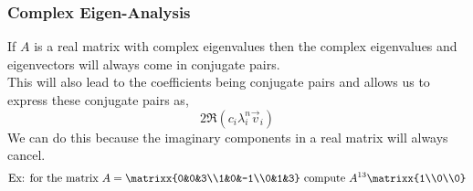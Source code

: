 \subsubsection{Complex Eigen-Analysis}
If $A$ is a real matrix with complex eigenvalues then the complex eigenvalues and eigenvectors will always come in conjugate pairs.\\
This will also lead to the coefficients being conjugate pairs and allows us to express these conjugate pairs as,
$$2\Re(c_i\lambda_i^n\vec{v}_i)$$
We can do this because the imaginary components in a real matrix will always cancel.
\begin{align*}
    \text{Ex: for the matrix }A=\matrixx{0&0&3\\1&0&-1\\0&1&3}\text{ compute }A^{13}\matrixx{1\\0\\0}
\end{align*}
